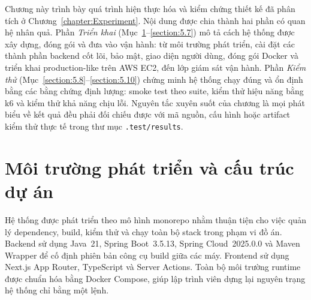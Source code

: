 \documentclass[../DoAn.tex]{subfiles}
\begin{document}
Chương này trình bày quá trình hiện thực hóa và kiểm chứng thiết kế đã phân tích ở
Chương~\ref{chapter:Experiment}. Nội dung được chia thành hai phần có quan hệ nhân quả.
Phần \textit{Triển khai} (Mục~\ref{section:5.1}--\ref{section:5.7}) mô tả cách hệ thống được
xây dựng, đóng gói và đưa vào vận hành: từ môi trường phát triển, cài đặt các thành phần
backend cốt lõi, bảo mật, giao diện người dùng, đóng gói Docker và triển khai production-like
trên AWS EC2, đến lớp giám sát vận hành. Phần \textit{Kiểm thử}
(Mục~\ref{section:5.8}--\ref{section:5.10}) chứng minh hệ thống chạy đúng và ổn định bằng các
bằng chứng định lượng: smoke test theo suite, kiểm thử hiệu năng bằng k6 và kiểm thử khả năng
chịu lỗi. Nguyên tắc xuyên suốt của chương là mọi phát biểu về kết quả đều phải đối chiếu được
với mã nguồn, cấu hình hoặc artifact kiểm thử thực tế trong thư mục \texttt{.test/results}.

\section{Môi trường phát triển và cấu trúc dự án}
\label{section:5.1}

Hệ thống được phát triển theo mô hình monorepo nhằm thuận tiện cho việc quản lý dependency,
build, kiểm thử và chạy toàn bộ stack trong phạm vi đồ án. Backend sử dụng Java~21, Spring
Boot~3.5.13, Spring Cloud~2025.0.0 và Maven Wrapper để cố định phiên bản công cụ build giữa
các máy. Frontend sử dụng Next.js App Router, TypeScript và Server Actions. Toàn bộ môi trường
runtime được chuẩn hóa bằng Docker Compose, giúp lập trình viên dựng lại nguyên trạng hệ thống
chỉ bằng một lệnh.
\end{document}
